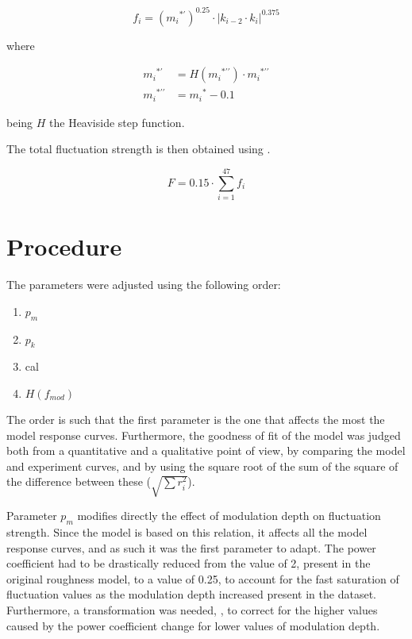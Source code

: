 \documentclass[../main.tex]{subfiles}
\begin{document}
\begin{modelchapter}
\begin{equation}
  f_i = ({m_i}^{*\prime})^{0.25} \cdot |k_{i-2} \cdot k_i|^{0.375}
  \label{eq:fi_final}
\end{equation}

where

\begin{align}
  {m_i}^{*\prime} &= H({m_i}^{*\prime\prime}) \cdot {m_i}^{*\prime\prime}
  \label{eq:md_transformation_1} \\
  {m_i}^{*\prime\prime} &= {m_i}^* - 0.1
  \label{eq:md_transformation_2}
\end{align}

being $H$ the Heaviside step function.

The total fluctuation strength is then obtained using
.

\begin{equation}
  F = 0.15 \cdot \displaystyle\sum_{i=1}^{47} f_i
  \label{eq:total_fluctuation}
\end{equation}

\section{Procedure}

The parameters were adjusted using the following order:
\begin{enumerate}
  \item $p_m$
  \item $p_k$
  \item cal
  \item $H(f_{mod})$
\end{enumerate}

The order is such that the first parameter is the one that affects the most the
model response curves. Furthermore, the goodness of fit of the model was judged
both from a quantitative and a qualitative point of view, by comparing the model
and experiment curves, and by using the square root of the sum of the square of
the difference between these ($\sqrt{\sum r_i^2}$).

Parameter $p_m$ modifies directly the effect of modulation depth on fluctuation
strength. Since the model is based on this relation, it affects all the model
response curves, and as such it was the first parameter to adapt. The power
coefficient had to be drastically reduced from the value of 2, present in the
original roughness model, to a value of 0.25, to account for the fast saturation
of fluctuation values as the modulation depth increased present in the dataset.
Furthermore, a transformation was needed,
, to correct for the higher
values caused by the power coefficient change for lower values of
modulation depth.


\end{modelchapter}
\end{document}
